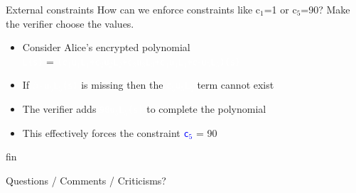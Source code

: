 \documentclass[dvipsnames]{beamer}
\newcommand{\pub}[1]{\textcolor{blue}{\texttt{#1}}}
\newcommand{\enc}[1]{\colorbox{SkyBlue!75}{\textcolor{white}{\texttt{#1}}}}
\begin{document}
    \begin{frame}{External constraints}
        How can we enforce constraints like c$_1$=1 or c$_5$=90?
        Make the verifier choose the values.

        \begin{itemize}
            \item Consider Alice's encrypted polynomial\\
            \enc{L(s)} = \enc{(c$_1$u$_1$L$_1$+c$_2$u$_2$L$_2$+c$_3$u$_3$L$_3$+c$_4$u$_4$L$_4$+c$_5$u$_5$L$_5$)(s)}
            \item If \enc{$\beta\cdot$u$_5$L$_5$(s)} is missing then the \enc{c$_5$u$_5$L$_5$} term cannot exist
            \item The verifier adds \enc{90u$_5$L$_5$(s)} to complete the polynomial
            \item This effectively forces the constraint \pub{c$_5$} = 90
        \end{itemize}
    \end{frame}

    \begin{frame}{fin}

    {\huge Questions / Comments / Criticisms?}
    \end{frame}
\end{document}
